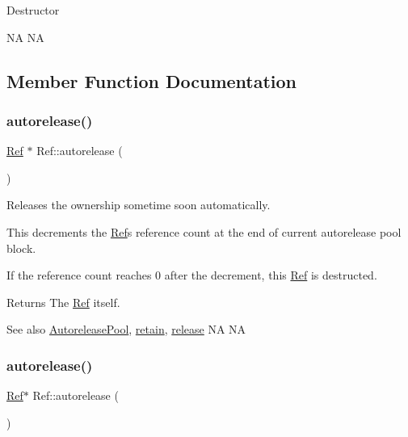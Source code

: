 Destructor

NA  NA 

\subsection{Member Function Documentation}
\mbox{\label{classRef_a065f6972ebb82de3e2143cbf10a7ac2d}} 
\subsubsection{\texorpdfstring{autorelease()}{autorelease()}\hspace{0.1cm}{\footnotesize\ttfamily [1/2]}}
{\footnotesize\ttfamily \hyperlink{classRef}{Ref} $\ast$ Ref\+::autorelease (\begin{DoxyParamCaption}{ }\end{DoxyParamCaption})}

Releases the ownership sometime soon automatically.

This decrements the \hyperlink{classRef}{Ref}\textquotesingle{}s reference count at the end of current autorelease pool block.

If the reference count reaches 0 after the decrement, this \hyperlink{classRef}{Ref} is destructed.

\begin{DoxyReturn}{Returns}
The \hyperlink{classRef}{Ref} itself.
\end{DoxyReturn}
\begin{DoxySeeAlso}{See also}
\hyperlink{classAutoreleasePool}{Autorelease\+Pool}, \hyperlink{classRef_a7d182cae1be1e80a9884cacd6ff9cb01}{retain}, \hyperlink{classRef_a6c8528cd8731765688943496c2eb3907}{release}  NA  NA 
\end{DoxySeeAlso}
\mbox{\label{classRef_a544b29e4e4b0c7fb32ccb6bf92d28da9}} 
\subsubsection{\texorpdfstring{autorelease()}{autorelease()}\hspace{0.1cm}{\footnotesize\ttfamily [2/2]}}
{\footnotesize\ttfamily \hyperlink{classRef}{Ref}$\ast$ Ref\+::autorelease (\begin{DoxyParamCaption}{ }\end{DoxyParamCaption})}

